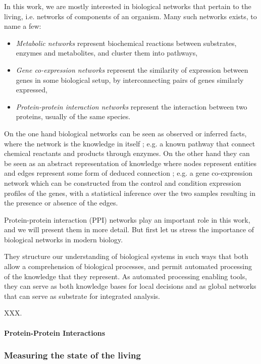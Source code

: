 			In this work, we are mostly interested in biological networks that pertain to the living, i.e. networks of components of an organism. Many such networks exists, to name a few:
			\begin{itemize}
				\item \emph{Metabolic networks} represent biochemical reactions between substrates, enzymes and metabolites, and cluster them into pathways,
				\item \emph{Gene co-expression networks} represent the similarity of expression between genes in some biological setup, by interconnecting pairs of genes similarly expressed,
				\item \emph{Protein-protein interaction networks} represent the interaction between two proteins, usually of the same species.
			\end{itemize}

			On the one hand biological networks can be seen as observed or inferred facts, where the network is the knowledge in itself ; e.g. a known pathway that connect chemical reactants and products through enzymes.
			On the other hand they can be seen as an abstract representation of knowledge where nodes represent entities and edges represent some form of deduced connection ; e.g. a gene co-expression network which can be constructed from the control and condition expression profiles of the genes, with a statistical inference over the two samples resulting in the presence or absence of the edges.

			Protein-protein interaction (PPI) networks play an important role in this work, and we will present them in more detail.
			But first let us stress the importance of biological networks in modern biology.
	
			They structure our understanding of biological systems in such ways that both allow a comprehension of biological processes, and permit automated processing of the knowledge that they represent.
			As automated processing enabling tools, they can serve as both knowledge bases for local decisions and as global networks that can serve as substrate for integrated analysis.

			XXX.

			\paragraph{Protein-Protein Interactions}

		\subsubsection{Measuring the state of the living}

